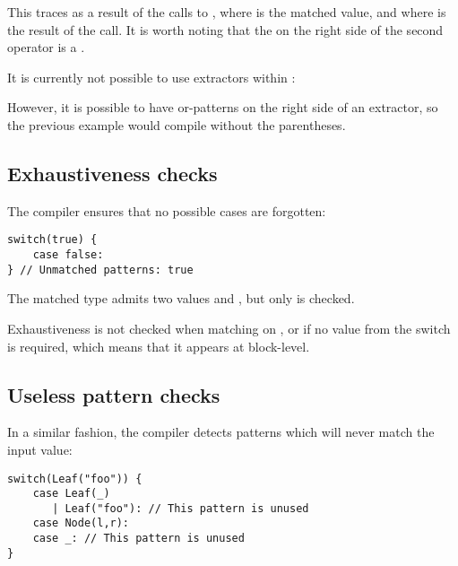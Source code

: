 
This traces  as a result of the calls to , where  is the matched value, and  where  is the result of the  call. It is worth noting that the  on the right side of the second \expr{=>} operator is a .

It is currently not possible to use extractors within :


However, it is possible to have or-patterns on the right side of an extractor, so the previous example would compile without the parentheses.


\subsection{Exhaustiveness checks}
\label{lf-pattern-matching-exhaustiveness}

The compiler ensures that no possible cases are forgotten:

\begin{lstlisting}
switch(true) {
    case false:
} // Unmatched patterns: true
\end{lstlisting}

The matched type  admits two values  and , but only  is checked.

Exhaustiveness is not checked when matching on ,  or  if no value from the switch is required, which means that it appears at block-level.




\subsection{Useless pattern checks}
\label{lf-pattern-matching-unused}

In a similar fashion, the compiler detects patterns which will never match the input value:

\begin{lstlisting}
switch(Leaf("foo")) {
    case Leaf(_)
       | Leaf("foo"): // This pattern is unused
    case Node(l,r):
    case _: // This pattern is unused
}
\end{lstlisting}




